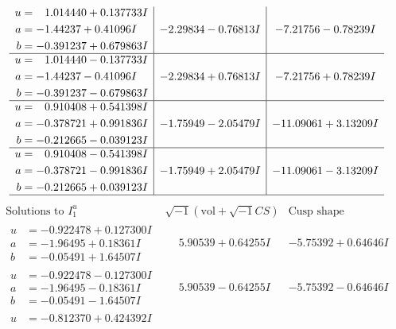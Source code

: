 \documentclass[1p]{elsarticle_modified}
\theoremstyle{definition}
\newcommand{\I}{\sqrt{-1}}
\begin{document}
$$\begin{array}{c|c|c}
\begin{aligned}
u &= \phantom{-}1.014440 + 0.137733 I \\
a &= -1.44237 + 0.41096 I \\
b &= -0.391237 + 0.679863 I\end{aligned}
 & -2.29834 - 0.76813 I & -7.21756 - 0.78239 I \\ \hline\begin{aligned}
u &= \phantom{-}1.014440 - 0.137733 I \\
a &= -1.44237 - 0.41096 I \\
b &= -0.391237 - 0.679863 I\end{aligned}
 & -2.29834 + 0.76813 I & -7.21756 + 0.78239 I \\ \hline\begin{aligned}
u &= \phantom{-}0.910408 + 0.541398 I \\
a &= -0.378721 + 0.991836 I \\
b &= -0.212665 - 0.039123 I\end{aligned}
 & -1.75949 - 2.05479 I & -11.09061 + 3.13209 I \\ \hline\begin{aligned}
u &= \phantom{-}0.910408 - 0.541398 I \\
a &= -0.378721 - 0.991836 I \\
b &= -0.212665 + 0.039123 I\end{aligned}
 & -1.75949 + 2.05479 I & -11.09061 - 3.13209 I\\
 \hline 
 \end{array}$$\newpage$$\begin{array}{c|c|c}  
\text{Solutions to }I^u_{1}& \I (\text{vol} + \sqrt{-1}CS) & \text{Cusp shape}\\
 \hline 
\begin{aligned}
u &= -0.922478 + 0.127300 I \\
a &= -1.96495 + 0.18361 I \\
b &= -0.05491 + 1.64507 I\end{aligned}
 & \phantom{-}5.90539 + 0.64255 I & -5.75392 + 0.64646 I \\ \hline\begin{aligned}
u &= -0.922478 - 0.127300 I \\
a &= -1.96495 - 0.18361 I \\
b &= -0.05491 - 1.64507 I\end{aligned}
 & \phantom{-}5.90539 - 0.64255 I & -5.75392 - 0.64646 I \\ \hline\begin{aligned}
u &= -0.812370 + 0.424392 I \\

\end{aligned}
\end{array}$$
\end{document}

